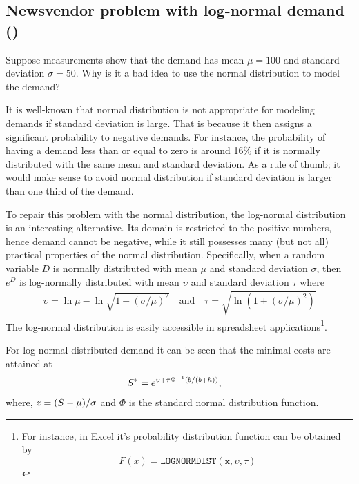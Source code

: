 \subsection{Newsvendor problem with log-normal demand (\faRocket)}
\label{sec:newsv-probl-with}

\begin{exercise}
Suppose measurements show that the demand has mean $\mu=100$ and standard deviation $\sigma=50$. Why is it a bad idea to use the normal distribution to model the demand?
\begin{solution}
It is well-known that normal distribution is not appropriate for modeling demands if standard deviation is large. That is because it then assigns a significant probability to negative demands. For instance, the probability of having a demand less than or equal to zero is around 16\% if it is normally distributed with the same mean and standard deviation. As a rule of thumb; it would make sense to avoid normal distribution if standard deviation is larger than one third of the demand. 
\end{solution}
\end{exercise}

To repair this problem with the normal distribution, the log-normal distribution is an interesting alternative.  Its domain is restricted to the positive numbers, hence demand cannot be negative,  while it still possesses many (but not all) practical properties of the normal distribution. Specifically, when a random variable $D$ is normally distributed with mean $\mu$ and standard deviation $\sigma$, then $e^D$ is log-normally distributed with mean $\upsilon$ and standard deviation $\tau$ where 
\begin{align*}
\upsilon = \ln \mu - \ln \sqrt{1+(\sigma/\mu)^2} \quad \text{and} \quad \tau = \sqrt{\ln(1+(\sigma/\mu)^2)}
\end{align*}
The log-normal distribution is easily accessible in spreadsheet applications\footnote{For instance, in Excel it's probability distribution function can be obtained by
\begin{equation*}
F(x)=\mathtt{LOGNORMDIST(x,\upsilon,\tau)} 
\end{equation*}
}.


For log-normal distributed demand it can be seen that the minimal costs are attained at
\begin{align*}
S^* & =e^{\upsilon + \tau \Phi^{-1}(b/(b+h))},
\end{align*}
where, $z=(S-\mu)/\sigma$ and $\Phi$ is the standard normal distribution function.


